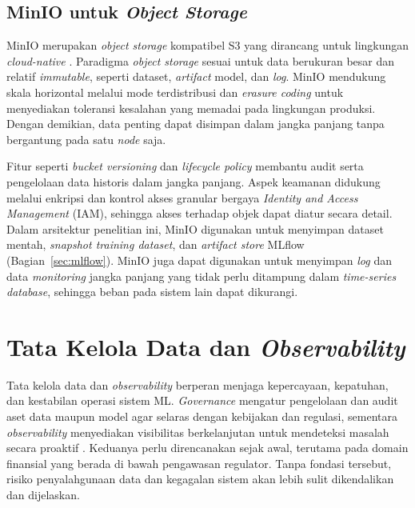 \subsection{MinIO untuk \textit{Object Storage}}
\label{sec:minio}

MinIO merupakan \textit{object storage} kompatibel S3 yang dirancang untuk lingkungan \textit{cloud-native} \autocite{minio2024}. Paradigma \textit{object storage} sesuai untuk data berukuran besar dan relatif \textit{immutable}, seperti dataset, \textit{artifact} model, dan \textit{log}. MinIO mendukung skala horizontal melalui mode terdistribusi dan \textit{erasure coding} untuk menyediakan toleransi kesalahan yang memadai pada lingkungan produksi. Dengan demikian, data penting dapat disimpan dalam jangka panjang tanpa bergantung pada satu \textit{node} saja.

Fitur seperti \textit{bucket versioning} dan \textit{lifecycle policy} membantu audit serta pengelolaan data historis dalam jangka panjang. Aspek keamanan didukung melalui enkripsi dan kontrol akses granular bergaya \textit{Identity and Access Management} (IAM), sehingga akses terhadap objek dapat diatur secara detail. Dalam arsitektur penelitian ini, MinIO digunakan untuk menyimpan dataset mentah, \textit{snapshot training dataset}, dan \textit{artifact store} MLflow (Bagian~\ref{sec:mlflow}). MinIO juga dapat digunakan untuk menyimpan \textit{log} dan data \textit{monitoring} jangka panjang yang tidak perlu ditampung dalam \textit{time-series database}, sehingga beban pada sistem lain dapat dikurangi.

\section{Tata Kelola Data dan \textit{Observability}}
\label{sec:governance}

Tata kelola data dan \textit{observability} berperan menjaga kepercayaan, kepatuhan, dan kestabilan operasi sistem ML. \textit{Governance} mengatur pengelolaan dan audit aset data maupun model agar selaras dengan kebijakan dan regulasi, sementara \textit{observability} menyediakan visibilitas berkelanjutan untuk mendeteksi masalah secara proaktif \autocite{bernardo2024data,stoyanovich2020responsible,cncf2024observability,ibm2024observability}. Keduanya perlu direncanakan sejak awal, terutama pada domain finansial yang berada di bawah pengawasan regulator. Tanpa fondasi tersebut, risiko penyalahgunaan data dan kegagalan sistem akan lebih sulit dikendalikan dan dijelaskan.

